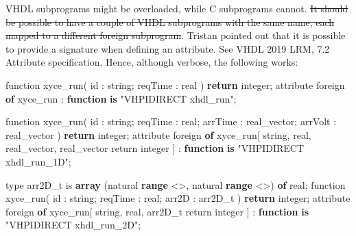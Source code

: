 \documentclass[
]{article}
\newenvironment{Shaded}{\begin{snugshade}}{\end{snugshade}}
\newcommand{\AttributeTok}[1]{\textcolor[rgb]{0.13,0.29,0.53}{#1}}
\newcommand{\ControlFlowTok}[1]{\textcolor[rgb]{0.13,0.29,0.53}{\textbf{#1}}}
\newcommand{\DataTypeTok}[1]{\textcolor[rgb]{0.13,0.29,0.53}{#1}}
\newcommand{\DecValTok}[1]{\textcolor[rgb]{0.00,0.00,0.81}{#1}}
\newcommand{\KeywordTok}[1]{\textcolor[rgb]{0.13,0.29,0.53}{\textbf{#1}}}
\newcommand{\NormalTok}[1]{#1}
\newcommand{\OtherTok}[1]{\textcolor[rgb]{0.56,0.35,0.01}{#1}}
\newcommand{\StringTok}[1]{\textcolor[rgb]{0.31,0.60,0.02}{#1}}
\begin{document}
VHDL subprograms might be overloaded, while C subprograms cannot. \st{It should be possible to have a couple of VHDL subprograms with the same name, each mapped to a different foreign subprogram}. Tristan pointed out that it is possible to provide a signature when defining an attribute. See VHDL 2019 LRM, 7.2 Attribute specification. Hence, although verbose, the following works:

\begin{Shaded}
\begin{Highlighting}[]
  \AttributeTok{function} \DecValTok{xyce\_run}\NormalTok{(}
\NormalTok{    id      }\OtherTok{:} \DataTypeTok{string}\NormalTok{;}
\NormalTok{    reqTime }\OtherTok{:} \DataTypeTok{real}
\NormalTok{  ) }\ControlFlowTok{return} \DataTypeTok{integer}\NormalTok{;}
  \OtherTok{attribute}\NormalTok{ foreign }\KeywordTok{of}\NormalTok{ xyce\_run }\OtherTok{:} \KeywordTok{function} \KeywordTok{is} \StringTok{"VHPIDIRECT xhdl\_run"}\NormalTok{;}

  \AttributeTok{function} \DecValTok{xyce\_run}\NormalTok{(}
\NormalTok{    id      }\OtherTok{:} \DataTypeTok{string}\NormalTok{;}
\NormalTok{    reqTime }\OtherTok{:} \DataTypeTok{real}\NormalTok{;}
\NormalTok{    arrTime }\OtherTok{:} \DataTypeTok{real\_vector}\NormalTok{;}
\NormalTok{    arrVolt }\OtherTok{:} \DataTypeTok{real\_vector}
\NormalTok{  ) }\ControlFlowTok{return} \DataTypeTok{integer}\NormalTok{;}
  \OtherTok{attribute}\NormalTok{ foreign }\KeywordTok{of}\NormalTok{ xyce\_run}\OtherTok{[}
    \DataTypeTok{string}\OtherTok{,}
    \DataTypeTok{real}\OtherTok{,}
    \DataTypeTok{real\_vector}\OtherTok{,}
    \DataTypeTok{real\_vector}
\NormalTok{    return }\DataTypeTok{integer}
  \OtherTok{]} \OtherTok{:} \KeywordTok{function} \KeywordTok{is} \StringTok{"VHPIDIRECT xhdl\_run\_1D"}\NormalTok{;}

  \OtherTok{type}\NormalTok{ arr2D\_t }\OtherTok{is} \KeywordTok{array}\NormalTok{ (}\DataTypeTok{natural} \KeywordTok{range} \OtherTok{\textless{}\textgreater{},} \DataTypeTok{natural} \KeywordTok{range} \OtherTok{\textless{}\textgreater{}}\NormalTok{) }\KeywordTok{of} \DataTypeTok{real}\NormalTok{;}
  \AttributeTok{function} \DecValTok{xyce\_run}\NormalTok{(}
\NormalTok{    id      }\OtherTok{:} \DataTypeTok{string}\NormalTok{;}
\NormalTok{    reqTime }\OtherTok{:} \DataTypeTok{real}\NormalTok{;}
\NormalTok{    arr2D   }\OtherTok{:}\NormalTok{ arr2D\_t}
\NormalTok{  ) }\ControlFlowTok{return} \DataTypeTok{integer}\NormalTok{;}
  \OtherTok{attribute}\NormalTok{ foreign }\KeywordTok{of}\NormalTok{ xyce\_run}\OtherTok{[}
    \DataTypeTok{string}\OtherTok{,}
    \DataTypeTok{real}\OtherTok{,}
\NormalTok{    arr2D\_t}
\NormalTok{    return }\DataTypeTok{integer}
  \OtherTok{]} \OtherTok{:} \KeywordTok{function} \KeywordTok{is} \StringTok{"VHPIDIRECT xhdl\_run\_2D"}\NormalTok{;}
\end{Highlighting}
\end{Shaded}
\end{document}
